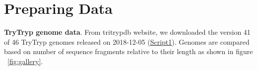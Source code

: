 \documentclass[
10pt, %
a4paper, %
oneside, %
headinclude,footinclude, %
BCOR5mm, %
]{scrartcl}
\title{\normalfont\spacedallcaps{Article Title}} %
\author{\spacedlowsmallcaps{Fatemeh Hadi Nezhad\textsuperscript{1}}}
\date{2019} %
\begin{document}

\renewcommand{\sectionmark}[1]{\markright{\spacedlowsmallcaps{#1}}} %
\lehead{\mbox{\llap{\small\thepage\kern1em\color{halfgray} \vline}\color{halfgray}\hspace{0.5em}\rightmark\hfil}} %

\pagestyle{scrheadings} %


\maketitle %

\setcounter{tocdepth}{2} %

\tableofcontents %


\let\thefootnote\relax{}


\newpage 


\section{Preparing Data}
\textbf{TryTryp genome data}. From tritrypdb website, we downloaded the version 41 of 46 TryTryp genomes released on 2018-12-05 (\href{thesentence}{Script1}). Genomes are compared based on number of sequence fragments relative to their length as shown in figure ~\vref{fig:gallery}.
\end{document}
